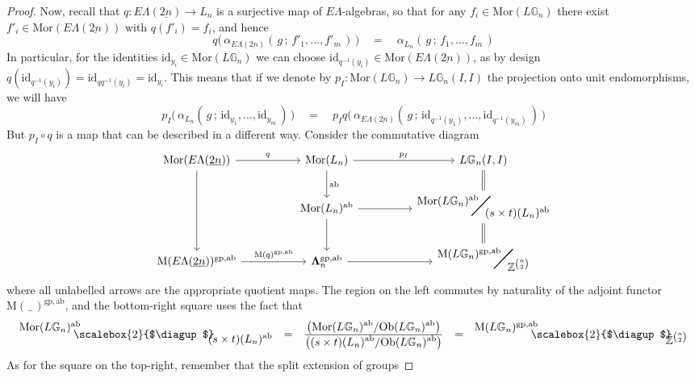 \documentclass{amsbook} %
\newcommand{\MLn}{\mathbf{\Lambda}_n}
\newcommand{\MorLn}{\mathrm{Mor}(L_n)}
\newcommand{\bigquotient}[2]{ \raisebox{0.75\height}{$#1$} \mkern-12mu\scalebox{2}{$\diagup$}\mkern-10mu \raisebox{-0.5\height}{$#2$} }
\newcommand{\ELnn}{E\Lambda(\underline{2n})}
\numberwithin{section}{chapter}
\begin{document}
\begin{proof}
Now, recall that $q: \ELnn \to L_n$ is a surjective map of $E\Lambda$-algebras, so that for any $f_i \in \mathrm{Mor}(L\mathbb{G}_{n})$ there exist $f'_i \in \mathrm{Mor}(\ELnn)$ with $q(f'_i) = f_i$, and hence
\[ q\big( \, \alpha_{\ELnn}( \, g \, ; \, f'_1, ..., f'_m \, ) \, \big) \quad = \quad \alpha_{L_n}( \, g \, ; \, f_1, ..., f_m \, ) \]
In particular, for the identities $\mathrm{id}_{y_i} \in \mathrm{Mor}(L\mathbb{G}_{n})$ we can choose $\mathrm{id}_{q^{-1}(y_i)} \in \mathrm{Mor}(\ELnn)$, as by design $q(\mathrm{id}_{q^{-1}(y_i)}) = \mathrm{id}_{qq^{-1}(y_i)} = \mathrm{id}_{y_i}$. This means that if we denote by $p_I :  \mathrm{Mor}(L\mathbb{G}_{n}) \to L\mathbb{G}_{n}(I,I)$ the projection onto unit endomorphisms, we will have
\[ p_I \big( \, \alpha_{L_n}( \, g \, ; \, \mathrm{id}_{y_1}, ..., \mathrm{id}_{y_m} \, ) \, \big) \quad = \quad  p_I q\big( \, \alpha_{\ELnn}( \, g \, ; \, \mathrm{id}_{q^{-1}(y_1)}, ..., \mathrm{id}_{q^{-1}(y_m)} \, ) \, \big) \]
But $p_I \circ q$ is a map that can be described in a different way. Consider the commutative diagram
\[ \begin{tikzcd}
\mathrm{Mor}(\ELnn) \ar[rr, "q"] \ar[dd] & & \MorLn \ar[d, "\mathrm{ab}"] \ar[rr, "p_I"] & &  L\mathbb{G}_{n}(I,I) \ar[d, equals] \\
& & \MorLn^{\mathrm{ab}} \ar[d] \ar[rr] & & \bigquotient{\mathrm{Mor}(L\mathbb{G}_{n})^{\mathrm{ab}}}{(s \times t)(L_n)^{\mathrm{ab}}} \ar[d, equals] \\
\mathrm{M}(\ELnn)^{\mathrm{gp},\mathrm{ab}} \ar[rr, "\mathrm{M}(q)^{\mathrm{gp},\mathrm{ab}}"] & & \MLn^{\mathrm{gp},\mathrm{ab}} \ar[rr] & & \bigquotient{\mathrm{M}(L\mathbb{G}_{n})^{\mathrm{gp}, \mathrm{ab}}}{\mathbb{Z}^{{n}\choose{2}}}
\end{tikzcd} \]
where all unlabelled arrows are the appropriate quotient maps. The region on the left commutes by naturality of the adjoint functor $\mathrm{M}(\, \_ \,)^{\mathrm{gp},\mathrm{ab}}$, and the bottom-right square uses the fact that
\[ \begin{array}{rllll}
			\bigquotient{\mathrm{Mor}(L\mathbb{G}_{n})^{\mathrm{ab}}}{(s \times t)(L_n)^{\mathrm{ab}}} & = & \frac{ \displaystyle  \left(\mathrm{Mor}(L\mathbb{G}_{n})^{\mathrm{ab}}/\mathrm{Ob}(L\mathbb{G}_{n})^{\mathrm{ab}} \right)}{ \displaystyle \left( (s \times t)(L_n)^{\mathrm{ab}}/\mathrm{Ob}(L\mathbb{G}_{n})^{\mathrm{ab}} \right)} & = & \bigquotient{\mathrm{M}(L\mathbb{G}_{n})^{\mathrm{gp}, \mathrm{ab}}}{\mathbb{Z}^{{n}\choose{2}}}
		\end{array}
\]
As for the square on the top-right, remember that the split extension of groups

\end{proof}
\end{document}
